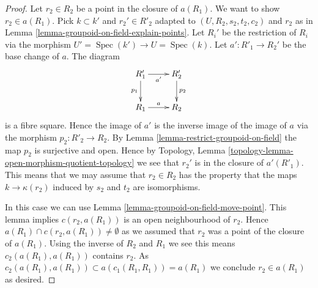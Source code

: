 \documentclass{stacks-project}
\theoremstyle{plain}
\theoremstyle{definition}
\theoremstyle{remark}
\numberwithin{equation}{subsection}
\def\Spec{\mathop{\mathrm{Spec}}}
\begin{document}
\begin{proof}
Let $r_2 \in R_2$ be a point in the closure of $a(R_1)$.
We want to show $r_2 \in a(R_1)$. Pick $k \subset k'$ and
$r_2' \in R'_2$ adapted to $(U, R_2, s_2, t_2, c_2)$ and $r_2$ as in
Lemma \ref{lemma-groupoid-on-field-explain-points}.
Let $R_i'$ be the restriction of $R_i$ via the morphism
$U' = \Spec(k') \to U = \Spec(k)$.
Let $a' : R'_1 \to R_2'$ be the base change of $a$. The diagram
$$
\xymatrix{
R'_1 \ar[r]_{a'} \ar[d]_{p_1} & R'_2 \ar[d]^{p_2} \\
R_1 \ar[r]^a & R_2
}
$$
is a fibre square. Hence the image of $a'$ is the inverse image of
the image of $a$ via the morphism $p_2 : R'_2 \to R_2$. By
Lemma \ref{lemma-restrict-groupoid-on-field}
the map $p_2$ is surjective and open. Hence by
Topology, Lemma \ref{topology-lemma-open-morphism-quotient-topology}
we see that $r_2'$ is in the closure of $a'(R'_1)$.
This means that we may assume that $r_2 \in R_2$ has
the property that the maps $k \to \kappa(r_2)$ induced
by $s_2$ and $t_2$ are isomorphisms.

\medskip\noindent
In this case we can use
Lemma \ref{lemma-groupoid-on-field-move-point}.
This lemma implies $c(r_2, a(R_1))$ is an open neighbourhood of $r_2$.
Hence $a(R_1) \cap c(r_2, a(R_1)) \not = \emptyset$ as we assumed
that $r_2$ was a point of the closure of $a(R_1)$.
Using the inverse of $R_2$ and $R_1$ we see this means
$c_2(a(R_1), a(R_1))$ contains $r_2$.
As $c_2(a(R_1), a(R_1)) \subset a(c_1(R_1, R_1)) = a(R_1)$
we conclude $r_2 \in a(R_1)$ as desired.
\end{proof}
\end{document}

